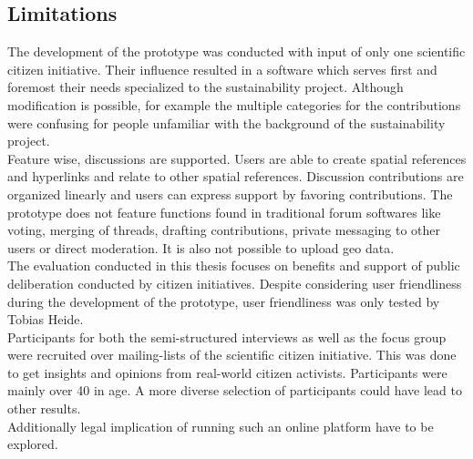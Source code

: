 \subsection{Limitations}
\label{sub:limitations}
The development of the prototype was conducted with input of only one scientific citizen initiative. Their influence resulted in a software which serves first and foremost their needs specialized to the sustainability project. Although modification is possible, for example the multiple categories for the contributions were confusing for people unfamiliar with the background of the sustainability project.\\
Feature wise, discussions are supported. Users are able to create spatial references and hyperlinks and relate to other spatial references. Discussion contributions are organized linearly and users can express support by favoring contributions. The prototype does not feature functions found in traditional forum softwares like voting, merging of threads, drafting contributions, private messaging to other users or direct moderation. It is also not possible to upload geo data. \\
The evaluation conducted in this thesis focuses on benefits and support of public deliberation conducted by citizen initiatives. Despite considering user friendliness during the development of the prototype, user friendliness was only tested by Tobias Heide.\\
Participants for both the semi-structured interviews as well as the focus group were recruited over mailing-lists of the scientific citizen initiative. This was done to get insights and opinions from real-world citizen activists. Participants were mainly over 40 in age. A more diverse selection of participants could have lead to other results.\\
Additionally legal implication of running such an online platform have to be explored.


